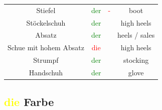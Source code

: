 \begin{center}
\begin{longtable} {|c|c|c|c|}
        Stiefel                & \textcolor{green}{der}  & \textcolor{red}{-}                      & boot          \\
        Stöckelschuh           & \textcolor{green}{der}  &                                         & high heels    \\
        Absatz                 & \textcolor{green}{der}  &                                         & heels / sales \\
        Schue mit hohem Absatz & \textcolor{red}{die}    &                                         & high heels    \\
        Strumpf                & \textcolor{green}{der}  &                                         & stocking      \\
        Handschuh              & \textcolor{green}{der}  &                                         & glove         \\
        \hline
    \end{longtable}
\end{center}

\subsection{\textcolor{yellow}{die} Farbe}

